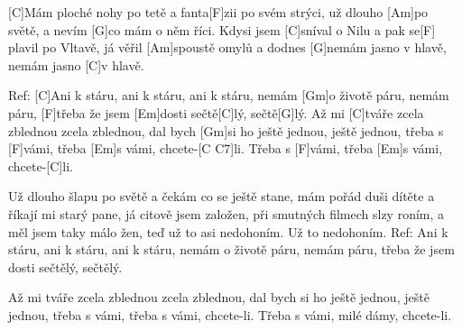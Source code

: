 
[C]Mám ploché nohy po tetě a fanta[F]zii po svém strýci,
už dlouho [Am] po světě, a nevím [G]co mám o něm říci.
Kdysi jsem [C]sníval o Nilu a pak se[F] plavil po Vltavě,
já věřil [Am]spoustě omylů a dodnes [G]nemám jasno v hlavě, nemám jasno [C]v hlavě.

Ref: [C]Ani k stáru, ani k stáru, ani k stáru,
nemám [Gm]o životě páru, nemám páru,
[F]třeba že jsem [Em]dosti sečtě[C]lý, sečtě[G]lý.
Až mi [C]tváře zcela zblednou zcela zblednou,
dal bych [Gm]si ho ještě jednou, ještě jednou,
třeba s [F]vámi, třeba [Em]s vámi, chcete-[C C7]li.
Třeba s [F]vámi, třeba [Em]s vámi, chcete-[C]li.

Už dlouho šlapu po světě a čekám co se ještě stane,
mám pořád duši dítěte a říkají mi starý pane,
já citově jsem založen, při smutných filmech slzy roním,
a měl jsem taky málo žen, teď už to asi nedohoním. Už to nedohoním.
Ref: Ani k stáru, ani k stáru, ani k stáru,
nemám o životě páru, nemám páru,
třeba že jsem dosti sečtělý, sečtělý.

Až mi tváře zcela zblednou zcela zblednou,
dal bych si ho ještě jednou, ještě jednou,
třeba s vámi, třeba s vámi, chcete-li.
Třeba s vámi, milé dámy, chcete-li.
